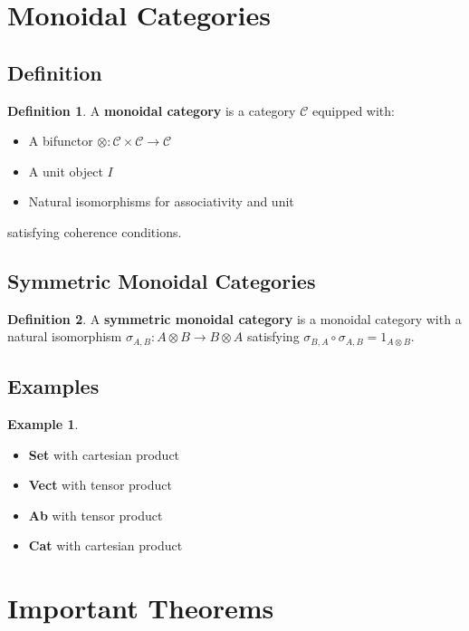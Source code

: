 \documentclass[11pt]{article}
\theoremstyle{definition}
\newtheorem{definition}{Definition}[section]
\newtheorem{example}{Example}[section]
\begin{document}
\section{Monoidal Categories}

\subsection{Definition}
\begin{definition}
A \textbf{monoidal category} is a category $\mathcal{C}$ equipped with:
\begin{itemize}
    \item A bifunctor $\otimes: \mathcal{C} \times \mathcal{C} \to \mathcal{C}$
    \item A unit object $I$
    \item Natural isomorphisms for associativity and unit
\end{itemize}
satisfying coherence conditions.
\end{definition}

\subsection{Symmetric Monoidal Categories}
\begin{definition}
A \textbf{symmetric monoidal category} is a monoidal category with a natural isomorphism $\sigma_{A,B}: A \otimes B \to B \otimes A$ satisfying $\sigma_{B,A} \circ \sigma_{A,B} = 1_{A \otimes B}$.
\end{definition}

\subsection{Examples}
\begin{example}
\begin{itemize}
    \item \textbf{Set} with cartesian product
    \item \textbf{Vect} with tensor product
    \item \textbf{Ab} with tensor product
    \item \textbf{Cat} with cartesian product
\end{itemize}
\end{example}

\section{Important Theorems}
\end{document}
